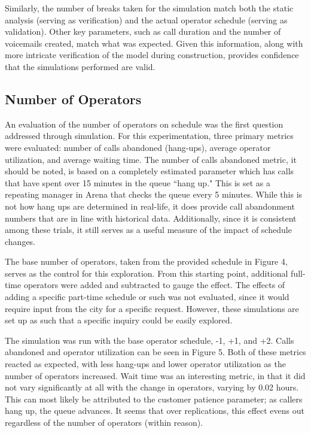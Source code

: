 \documentclass[12pt,twocolumn]{article}
\begin{document}
	  \par
	  
	  Similarly, the number of breaks taken for the simulation match both the static analysis (serving as verification) and the actual operator schedule (serving as validation).  Other key parameters, such as call duration and the number of voicemails created, match what was expected.  Given this information, along with more intricate verification of the model during construction, provides confidence that the simulations performed are valid.
	  
	  
	\subsection{Number of Operators}
	
	An evaluation of the number of operators on schedule was the first question addressed through simulation.  For this experimentation, three primary metrics were evaluated:  number of calls abandoned (hang-ups), average operator utilization, and average waiting time.  The number of calls abandoned metric, it should be noted, is based on a completely estimated parameter which has calls that have spent over 15 minutes in the queue ``hang up."  This is set as a repeating manager in Arena that checks the queue every 5 minutes.  While this is not how hang ups are determined in real-life, it does provide call abandonment numbers that are in line with historical data.  Additionally, since it is consistent among these trials, it still serves as a useful measure of the impact of schedule changes.
	
	\par
	
	The base number of operators, taken from the provided schedule in Figure 4, serves as the control for this exploration.  From this starting point, additional full-time operators were added and subtracted to gauge the effect.  The effects of adding a specific part-time schedule or such was not evaluated, since it would require input from the city for a specific request.  However, these simulations are set up as such that a specific inquiry could be easily explored.
	
	\par
	
	The simulation was run with the base operator schedule, -1, +1, and +2.  Calls abandoned and operator utilization can be seen in Figure 5.  Both of these metrics reacted as expected, with less hang-ups and lower operator utilization as the number of operators increased.  Wait time was an interesting metric, in that it did not vary significantly at all with the change in operators, varying by 0.02 hours.  This can most likely be attributed to the customer patience parameter; as callers hang up, the queue advances.  It seems that over replications, this effect evens out regardless of the number of operators (within reason).
	
\end{document}
